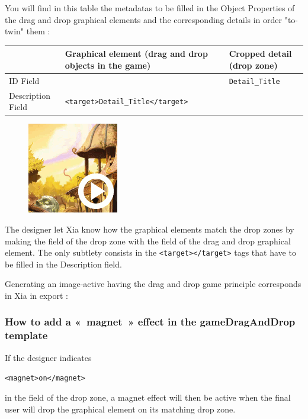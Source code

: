 You will find in this table the metadatas to be filled in the \chemin
{Object Properties} of the drag and drop graphical elements and the corresponding details in order "to-twin" them :

\begin{center}
\begin{tabular}{|p{}|p{2.5in}|p{1.5in}|}
\hline
 & Graphical element (drag and drop objects in the game) & Cropped detail (drop zone)\\
\hline
ID Field & & \verb|Detail_Title|\\
\hline
Description Field & \verb|<target>Detail_Title</target>| & \\
\hline
\end{tabular}
\end{center}

\begin{figure}
  \centering
  \includegraphics[scale=0.7]{./images/gameDragAndDrop} 
\end{figure}


The designer let Xia know how the graphical elements match the drop zones by 
making the  field of the drop zone 
with the  field of the drag and drop graphical element. 
The only subtlety consists in the  \verb|<target></target>| tags that have to be filled in the \chemin
{Description} field.

Generating an image-active having the drag and
drop game principle corresponds in Xia in export :



\subsubsection{How to add a «~magnet~» effect in the gameDragAndDrop template}

If the designer indicates\\
\begin{center}
\verb|<magnet>on</magnet>| 
\end{center}
in the  field of the drop zone, a 
magnet effect will then be active when the final user will drop the graphical element on its matching drop zone.

